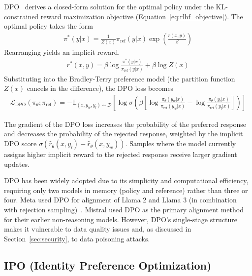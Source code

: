 \documentclass[12pt]{article}
\begin{document}
DPO~\cite{Rafailov2023DPO} derives a closed-form solution for the optimal policy under the KL-constrained reward maximization objective (Equation~\ref{eq:rlhf_objective}). The optimal policy takes the form
\begin{align}
\pi^*(y|x) = \frac{1}{Z(x)} \pi_{\text{ref}}(y|x) \exp\!\left(\frac{r(x,y)}{\beta}\right)
\end{align}
Rearranging yields an implicit reward.
\begin{align}
r^*(x,y) = \beta \log \frac{\pi^*(y|x)}{\pi_{\text{ref}}(y|x)} + \beta \log Z(x)
\end{align}
Substituting into the Bradley-Terry preference model (the partition function $Z(x)$ cancels in the difference), the DPO loss becomes
\begin{align}
\mathcal{L}_{\text{DPO}}(\pi_\theta; \pi_{\text{ref}}) = -\mathbb{E}_{(x, y_w, y_l) \sim \mathcal{D}} \left[ \log \sigma\!\left( \beta \left[ \log \frac{\pi_\theta(y_w|x)}{\pi_{\text{ref}}(y_w|x)} - \log \frac{\pi_\theta(y_l|x)}{\pi_{\text{ref}}(y_l|x)} \right] \right) \right]
\end{align}

The gradient of the DPO loss increases the probability of the preferred response and decreases the probability of the rejected response, weighted by the implicit DPO score $\sigma(\hat{r}_\theta(x, y_l) - \hat{r}_\theta(x, y_w))$. Samples where the model currently assigns higher implicit reward to the rejected response receive larger gradient updates.

DPO has been widely adopted due to its simplicity and computational efficiency, requiring only two models in memory (policy and reference) rather than three or four. Meta used DPO for alignment of Llama 2 and Llama 3 (in combination with rejection sampling)~\cite{Touvron2023Llama2}. Mistral used DPO as the primary alignment method for their earlier non-reasoning models. However, DPO's single-stage structure makes it vulnerable to data quality issues and, as discussed in Section~\ref{sec:security}, to data poisoning attacks.

\subsection{IPO (Identity Preference Optimization)}
\end{document}
